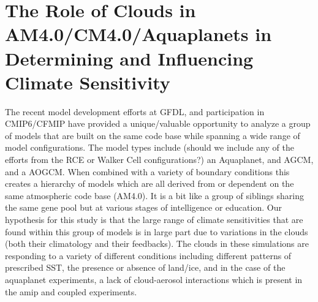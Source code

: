 \documentclass[11pt]{article}   	%
\begin{document}
\section{The Role of Clouds in AM4.0/CM4.0/Aquaplanets in Determining and Influencing Climate Sensitivity}


The recent model development efforts at GFDL, and participation in CMIP6/CFMIP have provided a 
unique/valuable opportunity to analyze a group of models that are built on the same code base while 
spanning a wide range of model configurations.  The model types include (should we include any of the
efforts from the RCE or Walker Cell configurations?) an Aquaplanet, and AGCM, 
and a AOGCM.  When combined with a variety of boundary conditions this creates a hierarchy of
models which are all derived from or dependent on the same atmospheric code base (AM4.0).  It is a 
bit like a group of siblings sharing the same gene pool but at various stages of intelligence or education.      
Our hypothesis for this study is that the large range of climate sensitivities that are found within this 
group of models is in large part due to variations in the clouds (both their climatology and their feedbacks).
The clouds in these simulations are responding to a variety of different conditions including different
patterns of prescribed SST, the presence or absence of land/ice, and in the case of the aquaplanet
experiments, a lack of cloud-aerosol interactions which is present in the amip and coupled experiments.  
\end{document}
